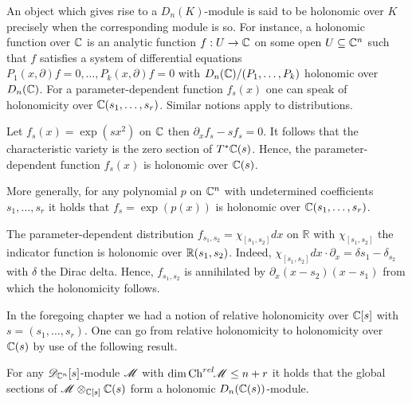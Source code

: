 An object which gives rise to a $D_n(K)$-module is said to be holonomic over $K$ precisely when the corresponding module is so.
For instance, a holonomic function over $\mathbb{C}$ is an analytic function $f:U\to \mathbb{C}$ on some open $U\subseteq \mathbb{C}^n$ such that $f$ satisfies a system of differential equations $P_{1}(x,\partial)f = 0,\ldots, P_{k}(x,\partial)f=0$ with $D_n(\mathbb{C})/(P_1,\ldots,P_k)$ holonomic over $D_n(\mathbb{C})$.
For a parameter-dependent function $f_s(x)$ one can speak of holonomicity over $\mathbb{C}(s_1,\ldots,s_r)$.
Similar notions apply to distributions.
\begin{example}
  Let $f_s(x) = \exp(sx^2)$ on $\mathbb{C}$ then  $\partial_{x}f_s - sf_s = 0$.
  It follows that the characteristic variety is the zero section of $T^*\mathbb{C}(s)$.
  Hence, the parameter-dependent function $f_s(x)$ is holonomic over $\mathbb{C}(s)$.

  More generally, for any polynomial $p$ on $\mathbb{C}^n$ with undetermined coefficients $s_1,\ldots,s_r$ it holds that $f_s = \exp(p(x))$ is holonomic over $\mathbb{C}(s_1,\ldots,s_r)$.
\end{example}
\begin{example}
  The parameter-dependent distribution $f_{s_1,s_2} = \chi_{[s_1,s_2]}dx$ on $\mathbb{R}$ with $\chi_{[s_1,s_2]}$ the indicator function is holonomic over $\mathbb{R}(s_1,s_2)$.
  Indeed, $\chi_{[s_1,s_2]}dx\cdot \partial_x = \delta{s_1} -\delta_{s_2}$ with $\delta$ the Dirac delta.
  Hence, $f_{s_1,s_2}$ is annihilated by $\partial_x(x-s_2)(x-s_1)$ from which the holonomicity follows.
\end{example}
In the foregoing chapter we had a notion of relative holonomicity over $\mathbb{C}[s]$ with $s = (s_1,\ldots,s_r)$.
One can go from relative holonomicity to holonomicity over $\mathbb{C}(s)$ by use of the following result.
\begin{lemma}
    For any $\mathscr{D}_{\mathbb{C}^n}[s]$-module $\mathscr{M}$ with $\dim\operatorname{Ch}^{rel}\mkern-5mu\mathscr{M}\leq n+r$ it holds that the global sections of $\mathscr{M}\otimes_{\mathbb{C}[s]}\mathbb{C}(s)$ form a holonomic $D_n(\mathbb{C}(s))$-module.
\end{lemma}
